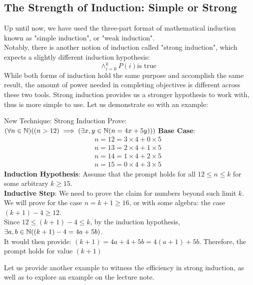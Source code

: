 \subsection{The Strength of Induction: Simple or Strong}
Up until now, we have used the three-part format of mathematical induction known as "simple induction", or "weak induction". \\
Notably, there is another notion of induction called "strong induction", which expects a slightly different induction hypothesis:
\[\land ^ {k} _ {i = 0} {P(i)} \text{is true}\]
While both forms of induction hold the same purpose and accomplish the same result, the amount of power needed in completing objectives is different across these two tools. Strong induction provides us a stronger hypothesis to work with, thus is more simple to use. Let us demonstrate so with an example:
\begin{ln-think}{New Technique: Strong Induction}{}
    Prove: $(\forall n \in \mathbb{N})((n > 12) \implies (\exists x, y \in \mathbb{N} (n = 4x + 5y)))$
    \tcblower
    \textbf{Base Case}:
    \begin{align*}
        n = 12 = 3 \times 4 + 0 \times 5 \\
        n = 13 = 2 \times 4 + 1 \times 5 \\
        n = 14 = 1 \times 4 + 2 \times 5 \\
        n = 15 = 0 \times 4 + 3 \times 5
    \end{align*}
    \textbf{Induction Hypothesis}: Assume that the prompt holds for all $12 \leq n \leq k$ for some arbitrary $k \geq 15$. \\
    \textbf{Inductive Step}: We need to prove the claim for numbers beyond such limit $k$. We will prove for the case $n = k + 1 \geq 16$, or with some algebra: the case $(k + 1) - 4 \geq 12$. \\
    Since $12 \leq (k + 1) - 4 \leq k$, by the induction hypothesis, $\exists a, b \in \mathbb{N} ((k + 1) - 4 = 4a + 5b)$. \\
    It would then provide: $(k + 1) = 4a + 4 + 5b = 4(a + 1) + 5b$. Therefore, the prompt holds for value $(k + 1)$
\end{ln-think}
Let us provide another example to witness the efficiency in strong induction, as well as to explore an example on the lecture note.
